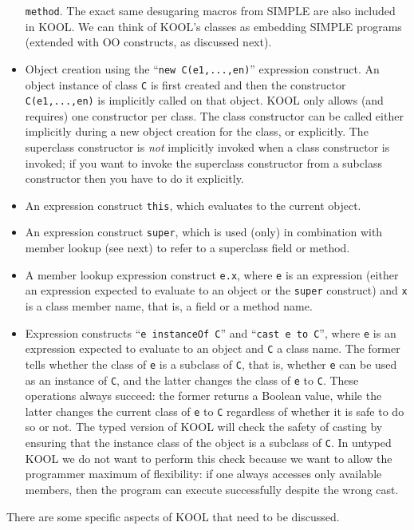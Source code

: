 \begin{latexComment}
\begin{itemize}
\texttt{method}.  The exact same desugaring macros from SIMPLE are
also included in KOOL.  We can think of KOOL's classes as embedding
SIMPLE programs (extended with OO constructs, as discussed next).
\item Object creation using the ``\texttt{new C(e1,...,en)}'' expression
construct.  An object instance of class \texttt{C} is first created and then
the constructor \texttt{C(e1,...,en)} is implicitly called on that
object.  KOOL only allows (and requires) one constructor per class.
The class constructor can be called either implicitly during a new
object creation for the class, or explicitly.  The superclass
constructor is {\em not} implicitly invoked when a class constructor
is invoked; if you want to invoke the superclass constructor from a
subclass constructor then you have to do it explicitly.
\item An expression construct \texttt{this}, which evaluates to the current
object.
\item An expression construct \texttt{super}, which is used (only) in
combination with member lookup (see next) to refer to a superclass field or
method.
\item A member lookup expression construct \texttt{e.x}, where \texttt{e}
is an expression (either an expression expected to evaluate to an object
or the \texttt{super} construct) and \texttt{x} is a class member name,
that is, a field or a method name.
\item Expression constructs ``\texttt{e instanceOf C}'' and
``\texttt{cast e to C}'', where \texttt{e} is an expression expected
to evaluate to an object and \texttt{C} a class name.  The former
tells whether the class of \texttt{e} is a subclass of \texttt{C},
that is, whether \texttt{e} can be used as an instance of \texttt{C},
and the latter changes the class of \texttt{e} to \texttt{C}.  These
operations always succeed: the former returns a Boolean value, while
the latter changes the current class of \texttt{e} to \texttt{C}
regardless of whether it is safe to do so or not.  The typed version
of KOOL will check the safety of casting by ensuring that the instance
class of the object is a subclass of \texttt{C}.  In untyped KOOL we
do not want to perform this check because we want to allow the
programmer maximum of flexibility: if one always accesses only
available members, then the program can execute successfully despite
the wrong cast.
\end{itemize}

There are some specific aspects of KOOL that need to be discussed.


\end{latexComment}
